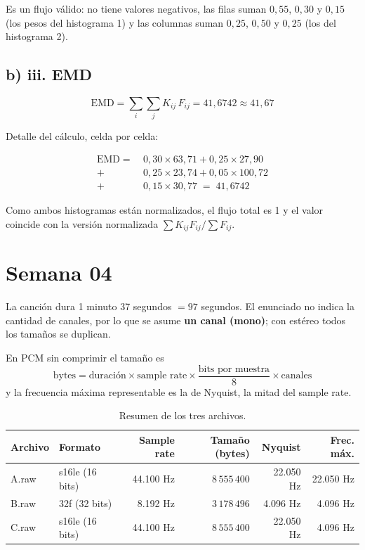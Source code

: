 \documentclass[12pt, a4paper]{article}
\begin{document}
Es un flujo válido: no tiene valores negativos, las filas suman $0{,}55$, $0{,}30$ y $0{,}15$ (los pesos del histograma 1) y las columnas suman $0{,}25$, $0{,}50$ y $0{,}25$ (los del histograma 2).

\subsection{b) iii. EMD}

\[
\mathrm{EMD} = \sum_{i}\sum_{j} K_{ij} \, F_{ij} = 41{,}6742 \approx 41{,}67
\]

Detalle del cálculo, celda por celda:

\[
\begin{aligned}
\mathrm{EMD} =\ & 0{,}30 \times 63{,}71 + 0{,}25 \times 27{,}90 \\
+\ & 0{,}25 \times 23{,}74 + 0{,}05 \times 100{,}72 \\
+\ & 0{,}15 \times 30{,}77 \;=\; 41{,}6742
\end{aligned}
\]

Como ambos histogramas están normalizados, el flujo total es 1 y el valor coincide con la versión normalizada $\sum K_{ij} F_{ij} / \sum F_{ij}$.

\section{Semana 04}

La canción dura 1 minuto 37 segundos $= 97$ segundos. El enunciado no indica la cantidad de canales, por lo que se asume \textbf{un canal (mono)}; con estéreo todos los tamaños se duplican.

En PCM sin comprimir el tamaño es
\[
\text{bytes} = \text{duración} \times \text{sample rate} \times \frac{\text{bits por muestra}}{8} \times \text{canales}
\]
y la frecuencia máxima representable es la de Nyquist, la mitad del sample rate.

\begin{table}[H]
\centering
\caption{Resumen de los tres archivos.}
\begin{tabular}{llrrrr}
\toprule
\textbf{Archivo} & \textbf{Formato} & \textbf{Sample rate} & \textbf{Tamaño (bytes)} & \textbf{Nyquist} & \textbf{Frec. máx.} \\
\midrule
A.raw & s16le (16 bits) & 44.100 Hz & $8\,555\,400$ & 22.050 Hz & 22.050 Hz \\
B.raw & 32f (32 bits) & 8.192 Hz & $3\,178\,496$ & 4.096 Hz & 4.096 Hz \\
C.raw & s16le (16 bits) & 44.100 Hz & $8\,555\,400$ & 22.050 Hz & 4.096 Hz \\
\bottomrule
\end{tabular}
\end{table}
\end{document}
